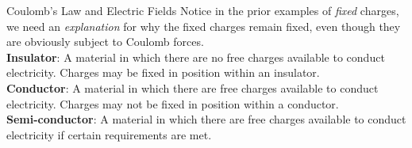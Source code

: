 \documentclass{beamer}
\begin{document}
\begin{frame}{Coulomb’s Law and Electric Fields}
Notice in the prior examples of \textit{fixed} charges, we need an \textit{explanation} for why the fixed charges remain fixed, even though they are obviously subject to Coulomb forces. \\ \vspace{0.5cm}
\textbf{Insulator}: A material in which there are no free charges available to conduct electricity.  Charges may be fixed in position within an insulator. \\
\textbf{Conductor}: A material in which there are free charges available to conduct electricity.  Charges may not be fixed in position within a conductor. \\
\textbf{Semi-conductor}: A material in which there are free charges available to conduct electricity if certain requirements are met.
\end{frame}
\end{document}

